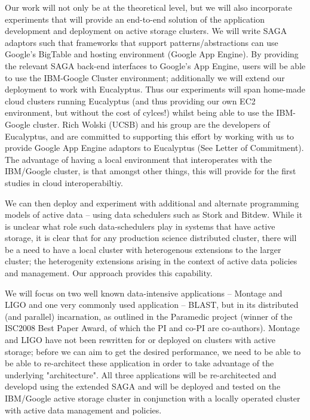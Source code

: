 \documentclass[10pt,letterpaper]{article}
\begin{document}

Our work will not only be at the theoretical level, but we will also
incorporate experiments that will provide an end-to-end solution of
the application development and deployment on active storage clusters.
We will write SAGA adaptors such that frameworks that support
patterns/abstractions can use Google's BigTable and hosting 
environment (Google App Engine).
By providing the relevant  SAGA back-end interfaces to Google's App Engine, users will be able
to use the IBM-Google Cluster environment; additionally 
we will extend our deployment to work with Eucalyptus.
Thus our experiments will span home-made cloud
clusters running Eucalyptus
(and thus providing our own EC2 environment, but without the
cost of cylces!) whilst being able to use the IBM-Google cluster.
Rich Wolski (UCSB) and his group  are the developers of Eucalyptus, and are 
committed to supporting this effort
by working with us to provide Google App Engine adaptors to Eucalyptus (See Letter of
Commitment). The advantage
of having a local environment that interoperates with the IBM/Google cluster, is that amongst
other things, this will provide for the first studies in cloud interoperabiltiy.


We can then deploy and experiment with additional and alternate programming
models of active data
-- using data schedulers such as Stork and Bitdew. While it is unclear
what role such data-schedulers play in systems
that have active storage, it is clear that for any production science distributed cluster, there will be a 
need to have a local cluster with heterogenous extensions to the larger
cluster;  the heterogenity extensions arising in the context of active data policies and management.
Our approach provides this capability.

We will focus on two well known data-intensive applications -- Montage and LIGO  
and one very commonly used application  -- BLAST, but in its distributed
(and parallel) incarnation,  as outlined in the Paramedic project (winner of the
ISC2008 Best Paper Award, of which the PI and co-PI are co-authors). Montage and LIGO have not
been rewritten for or deployed on clusters with active storage; before we can aim to get the
desired performance, we need to be able to be able to re-architect these
application in order to take advantage of the underlying "architecture". All three
applications will be re-architected and developd using the extended SAGA and will be
deployed and tested on the IBM/Google active storage cluster in conjunction with 
a locally operated cluster with active data management and policies.
\end{document}
